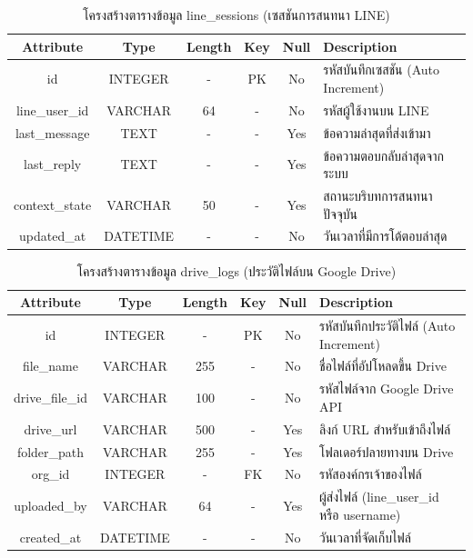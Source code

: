 \begin{table}[htbp]
\centering
\caption{โครงสร้างตารางข้อมูล line\_sessions (เซสชันการสนทนา LINE)}
\label{tab3:tb_sessions}
\begin{tabularx}{\textwidth}{| c | c | c | c | c | L |}
\hline
\textbf{Attribute} & \textbf{Type} & \textbf{Length} & \textbf{Key} & \textbf{Null} & \textbf{Description} \\ \hline
id & INTEGER & - & PK & No & รหัสบันทึกเซสชัน (Auto Increment) \\ \hline
line\_user\_id & VARCHAR & 64 & - & No & รหัสผู้ใช้งานบน LINE \\ \hline
last\_message & TEXT & - & - & Yes & ข้อความล่าสุดที่ส่งเข้ามา \\ \hline
last\_reply & TEXT & - & - & Yes & ข้อความตอบกลับล่าสุดจากระบบ \\ \hline
context\_state & VARCHAR & 50 & - & Yes & สถานะบริบทการสนทนาปัจจุบัน \\ \hline
updated\_at & DATETIME & - & - & No & วันเวลาที่มีการโต้ตอบล่าสุด \\ \hline
\end{tabularx}
\end{table}

\begin{table}[htbp]
\centering
\caption{โครงสร้างตารางข้อมูล drive\_logs (ประวัติไฟล์บน Google Drive)}
\label{tab3:tb_drive}
\begin{tabularx}{\textwidth}{| c | c | c | c | c | L |}
\hline
\textbf{Attribute} & \textbf{Type} & \textbf{Length} & \textbf{Key} & \textbf{Null} & \textbf{Description} \\ \hline
id & INTEGER & - & PK & No & รหัสบันทึกประวัติไฟล์ (Auto Increment) \\ \hline
file\_name & VARCHAR & 255 & - & No & ชื่อไฟล์ที่อัปโหลดขึ้น Drive \\ \hline
drive\_file\_id & VARCHAR & 100 & - & No & รหัสไฟล์จาก Google Drive API \\ \hline
drive\_url & VARCHAR & 500 & - & Yes & ลิงก์ URL สำหรับเข้าถึงไฟล์ \\ \hline
folder\_path & VARCHAR & 255 & - & Yes & โฟลเดอร์ปลายทางบน Drive \\ \hline
org\_id & INTEGER & - & FK & No & รหัสองค์กรเจ้าของไฟล์ \\ \hline
uploaded\_by & VARCHAR & 64 & - & Yes & ผู้ส่งไฟล์ (line\_user\_id หรือ username) \\ \hline
created\_at & DATETIME & - & - & No & วันเวลาที่จัดเก็บไฟล์ \\ \hline
\end{tabularx}
\end{table}

